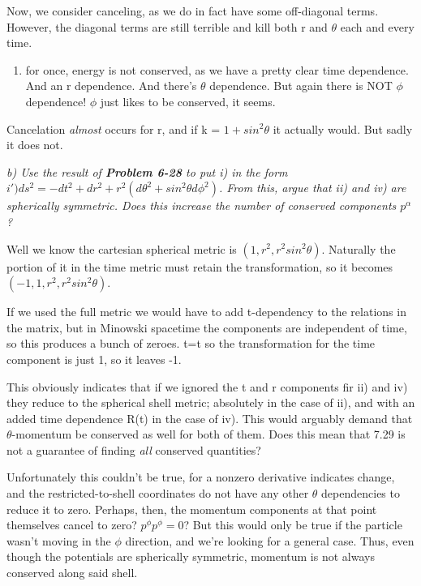 \documentclass[landscape,letterpaper,10pt,english]{article}
\providecommand{\tightlist}{%
      \setlength{\itemsep}{0pt}\setlength{\parskip}{0pt}}
\begin{document}
Now, we consider canceling, as we do in fact have some off-diagonal
terms. However, the diagonal terms are still terrible and kill both r
and \(\theta\) each and every time.

\begin{enumerate}
\def\labelenumi{\roman{enumi})}
\setcounter{enumi}{3}
\tightlist
\item
  for once, energy is not conserved, as we have a pretty clear time
  dependence. And an r dependence. And there's \(\theta\) dependence.
  But again there is NOT \(\phi\) dependence! \(\phi\) just likes to be
  conserved, it seems.
\end{enumerate}

Cancelation \emph{almost} occurs for r, and if k = \(1+sin^2\theta\) it
actually would. But sadly it does not.

    \emph{b) Use the result of \textbf{Problem 6-28} to put i) in the form
\(i') ds^2 = -dt^2 + dr^2 + r^2(d\theta^2 + sin^2\theta d\phi^2)\). From
this, argue that ii) and iv) are spherically symmetric. Does this
increase the number of conserved components \(p^\alpha\)?}

    Well we know the cartesian spherical metric is
\((1,r^2,r^2sin^2\theta)\). Naturally the portion of it in the time
metric must retain the transformation, so it becomes
\((-1,1,r^2,r^2sin^2\theta)\).

If we used the full metric we would have to add t-dependency to the
relations in the matrix, but in Minowski spacetime the components are
independent of time, so this produces a bunch of zeroes. t=t so the
transformation for the time component is just 1, so it leaves -1.

This obviously indicates that if we ignored the t and r components fir
ii) and iv) they reduce to the spherical shell metric; absolutely in the
case of ii), and with an added time dependence R(t) in the case of iv).
This would arguably demand that \(\theta\)-momentum be conserved as well
for both of them. Does this mean that 7.29 is not a guarantee of finding
\emph{all} conserved quantities?

Unfortunately this couldn't be true, for a nonzero derivative indicates
change, and the restricted-to-shell coordinates do not have any other
\(\theta\) dependencies to reduce it to zero. Perhaps, then, the
momentum components at that point themselves cancel to zero?
\(p^\phi p^\phi = 0\)? But this would only be true if the particle
wasn't moving in the \(\phi\) direction, and we're looking for a general
case. Thus, even though the potentials are spherically symmetric,
momentum is not always conserved along said shell.
\end{document}

